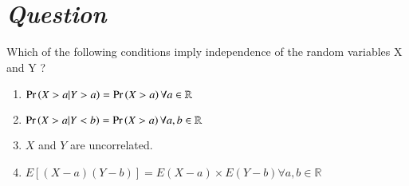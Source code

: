 \documentclass[journal,12pt,twocolumn]{IEEEtran}
\begin{document}
\section*{\emph{Question}}
Which of the following conditions imply independence of the random variables X
and Y ?
\begin{enumerate}
    \item$\Pr\left(X > a|Y > a\right) = \Pr\left(X > a\right) \forall a \in \mathbb{R}$\\ 
    \item$\Pr\left(X > a|Y < b\right) = \Pr\left(X > a\right) \forall a, b \in \mathbb{R}$\\ 
    \item$X$ and $Y$ are uncorrelated.\\
    \item$E[(X-a)(Y-b)]=E(X-a) \times E(Y-b) \forall a, b \in \mathbb{R}$\\
\end{enumerate}
\end{document}
